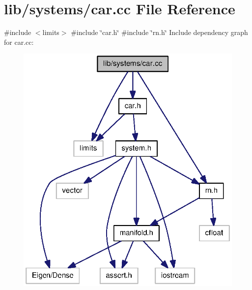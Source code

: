 \section{lib/systems/car.cc \-File \-Reference}
\label{car_8cc}
{\ttfamily \#include $<$limits$>$}\*
{\ttfamily \#include \char`\"{}car.\-h\char`\"{}}\*
{\ttfamily \#include \char`\"{}rn.\-h\char`\"{}}\*
\-Include dependency graph for car.\-cc\-:
\nopagebreak
\begin{figure}[H]
\begin{center}
\leavevmode
\includegraphics[width=322pt]{car_8cc__incl}
\end{center}
\end{figure}
